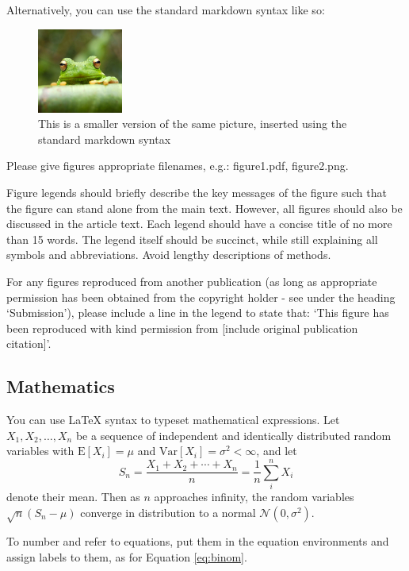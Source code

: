 \documentclass[9pt,a4paper,]{extarticle}
\begin{document}
Alternatively, you can use the standard markdown syntax like so:

\begin{figure}
\centering
\includegraphics[width=0.25000\textwidth]{frog.jpg}
\caption{This is a smaller version of the same picture, inserted using the standard markdown syntax}
\end{figure}

Please give figures appropriate filenames, e.g.: figure1.pdf, figure2.png.

Figure legends should briefly describe the key messages of the figure such that the figure can stand alone from the main text. However, all figures should also be discussed in the article text. Each legend should have a concise title of no more than 15 words. The legend itself should be succinct, while still explaining all symbols and abbreviations. Avoid lengthy descriptions of methods.

For any figures reproduced from another publication (as long as appropriate permission has been obtained from the copyright holder - see under the heading `Submission'), please include a line in the legend to state that: `This figure has been reproduced with kind permission from {[}include original publication citation{]}'.

\subsection{Mathematics}\label{mathematics}

You can use LaTeX syntax to typeset mathematical expressions. Let \(X_1, X_2, \ldots, X_n\) be a sequence of independent and identically distributed random variables with \(\text{E}[X_i] = \mu\) and \(\text{Var}[X_i] = \sigma^2 < \infty\), and let
\[S_n = \frac{X_1 + X_2 + \cdots + X_n}{n}
      = \frac{1}{n}\sum_{i}^{n} X_i\]
denote their mean. Then as \(n\) approaches infinity, the random variables \(\sqrt{n}(S_n - \mu)\) converge in distribution to a normal \(\mathcal{N}(0, \sigma^2)\).

To number and refer to equations, put them in the equation environments and assign labels to them, as for Equation \eqref{eq:binom}.
\end{document}
